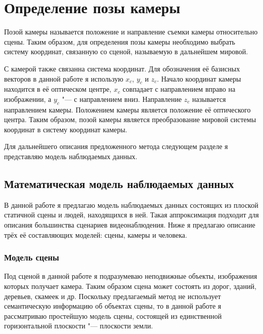 

\chapter{Определение позы камеры}

Позой камеры называется положение и направление съемки камеры относительно сцены. Таким образом, для определения позы камеры необходимо выбрать систему координат, связанную со сценой, называемую в дальнейшем мировой.

С камерой также связанна система координат. Для обозначения её базисных векторов в данной работе я использую $x_c$, $y_c$ и $z_c$. Начало координат камеры находится в её оптическом центре, $x_c$ совпадает с направлением вправо на изображении, а $y_c$ "--- с направлением вниз. Направление $z_c$ называется направлением камеры. Положением камеры является положение её оптического центра. Таким образом, позой камеры является преобразование мировой системы координат в систему координат камеры.

Для дальнейшего описания предложенного метода следующем разделе я представляю модель наблюдаемых данных.

\section{Математическая модель наблюдаемых данных}

В данной работе я предлагаю модель наблюдаемых данных состоящих из плоской статичной сцены и людей, находящихся в ней. Такая аппроксимация подходит для описания большинства сценариев видеонаблюдения. Ниже я предлагаю описание трёх её составляющих моделей: сцены, камеры и человека.

\subsection{Модель сцены}

Под сценой в данной работе я подразумеваю неподвижные объекты, изображения которых получает камера. Таким образом сцена может состоять из дорог, зданий, деревьев, скамеек и др. Поскольку предлагаемый метод не использует семантическую информацию об объектах сцены, то в данной работе я рассматриваю простейшую модель сцены, состоящей из единственной горизонтальной плоскости "--- плоскости земли.

